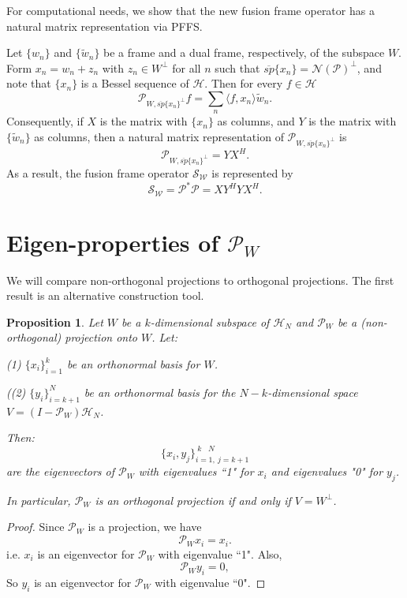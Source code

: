 \documentclass[11pt,reqno]{amsart}
\newtheorem{proposition}[thm]{Proposition}
\theoremstyle{remark}
\begin{document}
For computational needs, we show that the new fusion frame operator has a natural matrix representation via PFFS.

Let $\{w_n\}$ and $\{\tilde w_n\}$ be a frame and a dual frame, respectively, of the subspace $W$.  Form $x_n = w_n + z_n$ with $z_n\in W^{\perp}$ for all $n$ such that ${\overline{sp}}\{x_n\}={{\mathcal N}}({{\mathcal P}})^{\perp}$, and
note that $\{x_n\}$ is a Bessel sequence of ${\mathcal H}$.
Then for every $f\in\mathcal{H}$
\[
{{\mathcal P}}_{W,{\overline{sp}}\{x_n\}^{\perp}} f = \sum_n{\langle} f, x_n{\rangle} \tilde w_n.
\]
Consequently, if $X$ is the matrix with $\{x_n\}$ as columns, and $Y$ is the matrix with $\{\tilde w_n\}$ as columns, then a natural matrix representation of ${{\mathcal P}}_{W,{\overline{sp}}\{x_n\}^{\perp}}$ is
\[
    {{\mathcal P}}_{W,{\overline{sp}}\{x_n\}^{\perp}} = YX^{H}.
\]
As a result, the fusion frame operator ${{\mathcal S}_{{\mathcal W}}}$ is represented by
\[
{{\mathcal S}_{{\mathcal W}}}= {{\mathcal P}}^* {{\mathcal P}} = XY^{H}YX^{H}.
\]

\section{Eigen-properties of ${{\mathcal P}}_W$}

We will compare non-orthogonal projections to orthogonal projections.
The first result is an alternative construction tool.

\begin{proposition}\label{prop1}
Let $W$ be a $k$-dimensional subspace of ${\mathcal H}_N$ and ${\mathcal P}_W$ be
a (non-orthogonal) projection onto $W$.  Let:

(1)  $\{x_i\}_{i=1}^k$ be an orthonormal basis for $W$.

((2)  $\{y_i\}_{i=k+1}^N$ be an orthonormal basis for the $N-k$-dimensional
space $V=(I-{\mathcal P}_W){\mathcal H}_N$.

Then:
\[ \{x_i,y_j\}_{i=1,\ j=k+1}^{\  k\ \  \ \ N}\]
are the eigenvectors of ${\mathcal P}_W$ with eigenvalues ``1" for $x_i$ and
eigenvalues "0" for $y_j$.

In particular, ${\mathcal P}_W$ is an orthogonal projection if and only if $V=W^{\perp}$.

\end{proposition}

\begin{proof}
Since ${\mathcal P}_W$ is a projection, we have
\[ {\mathcal P}_Wx_i = x_i.\]
i.e.  $x_i$ is an eigenvector for ${\mathcal P}_W$ with eigenvalue ``1".  Also,
\[ {\mathcal P}_Wy_i = 0, \]
So $y_i$ is an eigenvector for ${\mathcal P}_W$ with eigenvalue ``0".
\end{proof}
\end{document}
